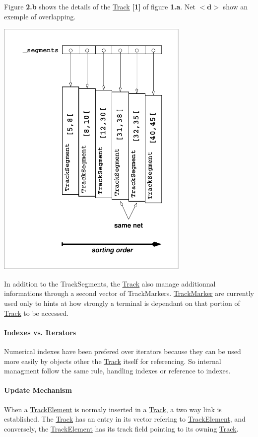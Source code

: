 Figure {\bfseries 2.\+b} shows the details of the \hyperlink{classKite_1_1Track}{Track} {\bfseries \mbox{[}1\mbox{]}} of figure {\bfseries 1.\+a}. Net {\bfseries $<$d$>$} show an exemple of overlapping.

 
\begin{DoxyImage}
\includegraphics[width=0.7\textwidth]{Track-1}
\end{DoxyImage}


In addition to the Track\+Segments, the \hyperlink{classKite_1_1Track}{Track} also manage additionnal informations through a second vector of Track\+Markers. \hyperlink{classKite_1_1TrackMarker}{Track\+Marker} are currently used only to hints at how strongly a terminal is dependant on that portion of \hyperlink{classKite_1_1Track}{Track} to be accessed.\hypertarget{classKite_1_1Track_ssecTrackIndexes}{}\paragraph{Indexes vs. Iterators}\label{classKite_1_1Track_ssecTrackIndexes}
Numerical indexes have been prefered over iterators because they can be used more easily by objects other the \hyperlink{classKite_1_1Track}{Track} itself for referencing. So internal managment follow the same rule, handling indexes or reference to indexes.\hypertarget{classKite_1_1Track_ssecTrackUpdate}{}\paragraph{Update Mechanism}\label{classKite_1_1Track_ssecTrackUpdate}
When a \hyperlink{classKite_1_1TrackElement}{Track\+Element} is normaly inserted in a \hyperlink{classKite_1_1Track}{Track}, a two way link is established. The \hyperlink{classKite_1_1Track}{Track} has an entry in it\textquotesingle{}s vector refering to \hyperlink{classKite_1_1TrackElement}{Track\+Element}, and conversely, the \hyperlink{classKite_1_1TrackElement}{Track\+Element} has it\textquotesingle{}s {\ttfamily track} field pointing to it\textquotesingle{}s owning \hyperlink{classKite_1_1Track}{Track}.

